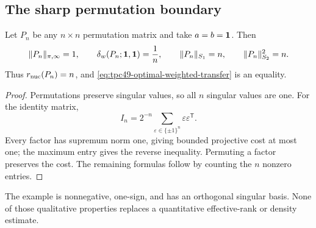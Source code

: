 \subsection{The sharp permutation boundary}

\begin{proposition}
\label{prop:tpc49-permutation-sharp}
Let \(P_n\) be any \(n\times n\) permutation matrix and take
\(a=b=\mathbf 1\).  Then
\begin{equation}
 \|P_n\|_{\pi,\infty}=1,
 \qquad
 \delta_w(P_n;\mathbf 1,\mathbf 1)=\frac1n,
 \qquad
 \|P_n\|_{S_1}=n,
 \qquad
 \|P_n\|_{S_2}^2=n.
 \label{eq:tpc49-permutation-data}
\end{equation}
Thus \(r_{\rm nuc}(P_n)=n\), and
\eqref{eq:tpc49-optimal-weighted-transfer} is an equality.
\end{proposition}

\begin{proof}
Permutations preserve singular values, so all \(n\) singular values are
one.  For the identity matrix,
\begin{equation}
 I_n=2^{-n}\sum_{\varepsilon\in\{\pm1\}^n}
 \varepsilon\varepsilon^{\mathsf T}.
 \label{eq:tpc49-Rademacher-identity}
\end{equation}
Every factor has supremum norm one, giving bounded projective cost at
most one; the maximum entry gives the reverse inequality.  Permuting a
factor preserves the cost.  The remaining formulas follow by counting
the \(n\) nonzero entries.
\end{proof}

The example is nonnegative, one-sign, and has an orthogonal singular
basis.  None of those qualitative properties replaces a quantitative
effective-rank or density estimate.
